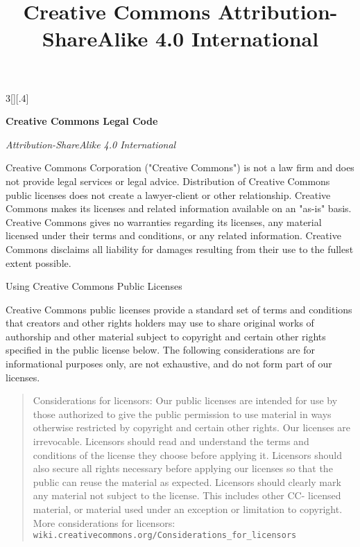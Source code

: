 \documentclass[8pt,a4paper]{article}
\title{Creative Commons Attribution-ShareAlike 4.0 International}
\begin{document}
%

\begin{multicols}{3}[][.4\paperwidth]%
 {%




  \textbf{Creative Commons Legal Code}
  \smallskip

  \emph{Attribution-ShareAlike 4.0 International}
  \smallskip

Creative Commons Corporation ("Creative Commons") is not a law firm and
does not provide legal services or legal advice. Distribution of
Creative Commons public licenses does not create a lawyer-client or
other relationship. Creative Commons makes its licenses and related
information available on an "as-is" basis. Creative Commons gives no
warranties regarding its licenses, any material licensed under their
terms and conditions, or any related information. Creative Commons
disclaims all liability for damages resulting from their use to the
fullest extent possible.

\smallskip

Using Creative Commons Public Licenses

\smallskip

Creative Commons public licenses provide a standard set of terms and
conditions that creators and other rights holders may use to share
original works of authorship and other material subject to copyright
and certain other rights specified in the public license below. The
following considerations are for informational purposes only, are not
exhaustive, and do not form part of our licenses.

   \begin{quote}

     Considerations for licensors: Our public licenses are
     intended for use by those authorized to give the public
     permission to use material in ways otherwise restricted by
     copyright and certain other rights. Our licenses are
     irrevocable. Licensors should read and understand the terms
     and conditions of the license they choose before applying it.
     Licensors should also secure all rights necessary before
     applying our licenses so that the public can reuse the
     material as expected. Licensors should clearly mark any
     material not subject to the license. This includes other CC-
     licensed material, or material used under an exception or
     limitation to copyright. More considerations for licensors:
     \texttt{wiki.creativecommons.org/Considerations\_for\_licensors}


\end{quote}}
\end{multicols}
\end{document}
